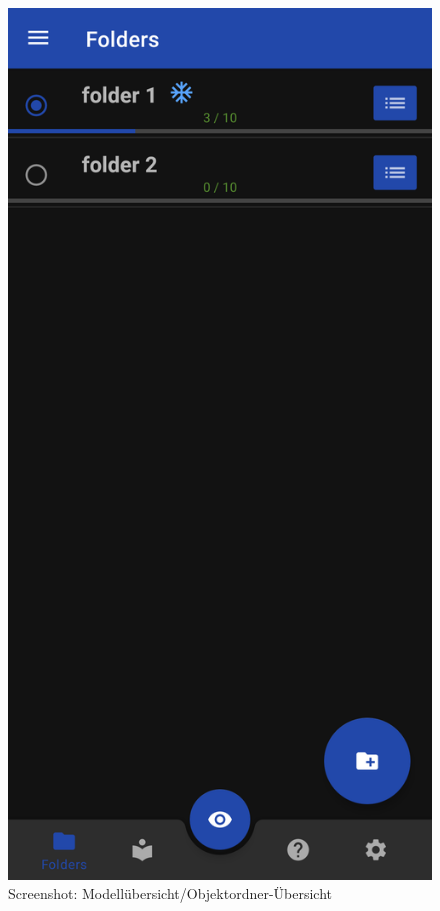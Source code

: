 \documentclass[oneside]{ausarbeitung}
\begin{document}
\begin{figure}[hptb]
	\centering
	\includegraphics[height=0.6\textheight]{images/screenshots/model-overview.png}
	\caption{Screenshot: Modellübersicht/Objektordner-Übersicht}
	\label{fig:screenshot:model-overview}
\end{figure}
\end{document}
